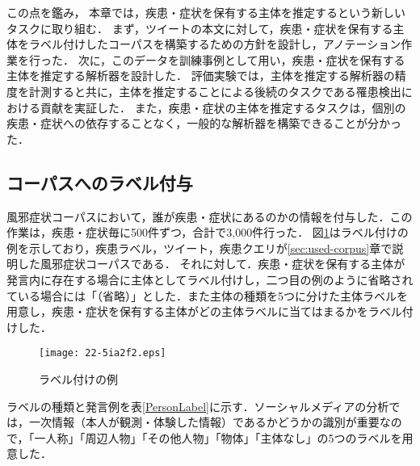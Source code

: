 \documentclass[japanese]{jnlp_1.4}
\begin{document}
この点を鑑み， 本章では，疾患・症状を保有する主体を推定するという新しいタスクに取り組む．
まず，ツイートの本文に対して，疾患・症状を保有する主体をラベル付けしたコーパスを構築するための方針を設計し，アノテーション作業を行った．
次に，このデータを訓練事例として用い，疾患・症状を保有する主体を推定する解析器を設計した．
評価実験では，主体を推定する解析器の精度を計測すると共に，主体を推定することによる後続のタスクである罹患検出における貢献を実証した．
また，疾患・症状の主体を推定するタスクは，個別の疾患・症状への依存することなく，一般的な解析器を構築できることが分かった．


\subsection{コーパスへのラベル付与}
\label{sec:corpus}

風邪症状コーパスにおいて，誰が疾患・症状にあるのかの情報を付与した．この作業は，疾患・症状毎に500件ずつ，合計で3,000件行った．
図\ref{LabelExa}はラベル付けの例を示しており，疾患ラベル，ツイート，疾患クエリが\ref{sec:used-corpus}章で説明した風邪症状コーパスである．
それに対して．疾患・症状を保有する主体が発言内に存在する場合に主体としてラベル付けし，二つ目の例のように省略されている場合には「（省略）」とした．また主体の種類を5つに分けた主体ラベルを用意し，疾患・症状を保有する主体がどの主体ラベルに当てはまるかをラベル付けした．

\begin{figure}[b]
  \begin{center}
  \texttt{[image: 22-5ia2f2.eps]}
  \end{center}
  \caption{ラベル付けの例}
  \label{LabelExa}
\end{figure}

ラベルの種類と発言例を表\ref{PersonLabel}に示す．ソーシャルメディアの分析では，一次情報（本人が観測・体験した情報）であるかどうかの識別が重要なので，「一人称」「周辺人物」「その他人物」「物体」「主体なし」の5つのラベルを用意した．
\end{document}
